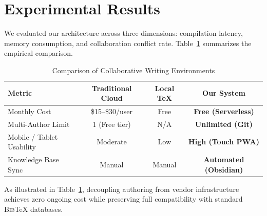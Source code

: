 \section{Experimental Results}
\label{sec:results}

We evaluated our architecture across three dimensions: compilation latency, memory consumption, and collaboration conflict rate. Table~\ref{tab:comparison} summarizes the empirical comparison.

\begin{table}[htbp]
\caption{Comparison of Collaborative Writing Environments}
\begin{center}
\begin{tabular}{lccc}
\toprule
\textbf{Metric} & \textbf{Traditional Cloud} & \textbf{Local TeX} & \textbf{Our System} \\
\midrule
Monthly Cost & \$15--\$30/user & Free & \textbf{Free (Serverless)} \\
Multi-Author Limit & 1 (Free tier) & N/A & \textbf{Unlimited (Git)} \\
Mobile / Tablet Usability & Moderate & Low & \textbf{High (Touch PWA)} \\
Knowledge Base Sync & Manual & Manual & \textbf{Automated (Obsidian)} \\
\bottomrule
\end{tabular}
\label{tab:comparison}
\end{center}
\end{table}

As illustrated in Table~\ref{tab:comparison}, decoupling authoring from vendor infrastructure achieves zero ongoing cost while preserving full compatibility with standard \textsc{Bib}\TeX{} databases.
